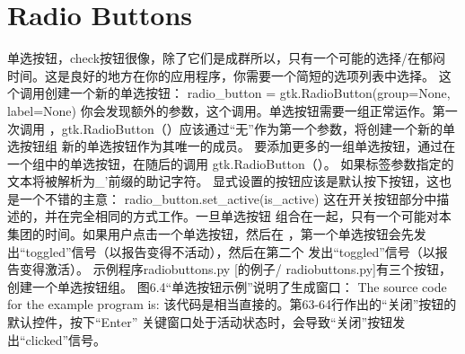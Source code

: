 \section{Radio Buttons}
单选按钮，check按钮很像，除了它们是成群所以，只有一个可能的选择/在郁闷
时间。这是良好的地方在你的应用程序，你需要一个简短的选项列表中选择。
这个调用创建一个新的单选按钮：
radio_button = gtk.RadioButton(group=None, label=None)
你会发现额外的参数，这个调用。单选按钮需要一组正常运作。第一次调用
，gtk.RadioButton（）应该通过“无”作为第一个参数，将创建一个新的单选按钮组
新的单选按钮作为其唯一的成员。
要添加更多的一组单选按钮，通过在一个组中的单选按钮，在随后的调用
gtk.RadioButton（）。
如果标签参数指定的文本将被解析为_'前缀的助记字符。
显式设置的按钮应该是默认按下按钮，这也是一个不错的主意：
radio_button.set_active(is_active)
这在开关按钮部分中描述的，并在完全相同的方式工作。一旦单选按钮
组合在一起，只有一个可能对本集团的时间。如果用户点击一个单选按钮，然后在
，第一个单选按钮会先发出“toggled”信号（以报告变得不活动），然后在第二个
发出“toggled”信号（以报告变得激活）。
示例程序radiobuttons.py [的例子/ radiobuttons.py]有三个按钮，创建一个单选按钮组。
图6.4“单选按钮示例”说明了生成窗口：
The source code for the example program is:
该代码是相当直接的。第63-64行作出的“关闭”按钮的默认控件，按下“Enter”
关键窗口处于活动状态时，会导致“关闭”按钮发出“clicked”信号。
